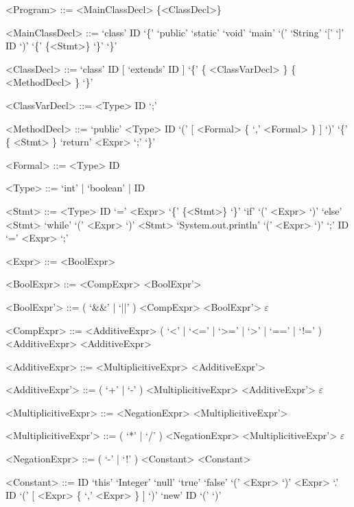 \documentclass{report}
\begin{document}
\setlength{\grammarparsep}{8pt} %
\setlength{\grammarindent}{12em} %

\begin{grammar}

<Program> ::= <MainClassDecl> \{<ClassDecl>\}

<MainClassDecl> ::= `class' ID `\{' `public' `static' `void' `main' `(' `String' `[' `]' ID `)' `\{' \{<Stmt>\} `\}' `\}'

<ClassDecl> ::= `class' ID [ `extends' ID ] `\{' \{ <ClassVarDecl> \} \{ <MethodDecl> \} `\}'

<ClassVarDecl> ::= <Type> ID `;'

<MethodDecl> ::= `public' <Type> ID `(' [ <Formal> \{ `,' <Formal> \} ] `)' `\{' \{ <Stmt> \} `return' <Expr> `;' `\}'

<Formal> ::= <Type> ID

<Type> ::= `int' | `boolean' | ID

<Stmt> ::= <Type> ID `=' <Expr>
\alt `\{' \{<Stmt>\} `\}'
\alt `if' `(' <Expr> `)' `else' <Stmt>
\alt `while' `(' <Expr> `)' <Stmt>
\alt `System.out.println' `(' <Expr> `)' `;'
\alt ID `=' <Expr> `;'

<Expr> ::= <BoolExpr>

<BoolExpr> ::= <CompExpr> <BoolExpr'>

<BoolExpr'> ::= ( `&&' | `||' ) <CompExpr> <BoolExpr'>
\alt $\varepsilon$

<CompExpr> ::= <AdditiveExpr> ( `<' | `<=' | `>=' | `>' | `==' | `!=' ) <AdditiveExpr>
\alt <AdditiveExpr>

<AdditiveExpr> ::= <MultiplicitiveExpr> <AdditiveExpr'>

<AdditiveExpr'> ::= ( `+' | `-' ) <MultiplicitiveExpr> <AdditiveExpr'>
\alt $\varepsilon$


<MultiplicitiveExpr> ::= <NegationExpr> <MultiplicitiveExpr'>

<MultiplicitiveExpr'> ::= ( `*' | `/' ) <NegationExpr> <MultiplicitiveExpr'>
\alt $\varepsilon$

<NegationExpr> ::= ( `-' | `!' ) <Constant>
\alt <Constant>

<Constant> ::= ID
\alt `this'
\alt `Integer'
\alt `null'
\alt `true'
\alt `false'
\alt `(' <Expr> `)'
\alt <Expr> `.' ID `(' [ <Expr> \{ `,' <Expr> \} ] `)'
\alt `new' ID `(' `)'

\end{grammar}
\end{document}
